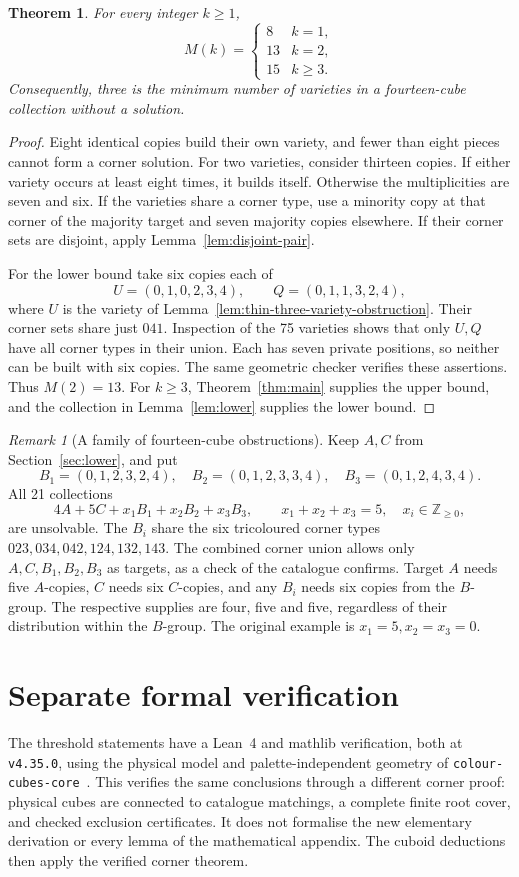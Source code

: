\documentclass[11pt]{article}
\newtheorem{theorem}{Theorem}
\theoremstyle{remark}
\newtheorem*{remark}{Remark}
\begin{document}
\begin{theorem}\label{thm:support}
For every integer $k\ge1$,
\[
 M(k)=\begin{cases}8&k=1,\\13&k=2,\\15&k\ge3.\end{cases}
\]
Consequently, three is the minimum number of varieties in a fourteen-cube
collection without a solution.
\end{theorem}
\begin{proof}
Eight identical copies build their own variety, and fewer than eight pieces
cannot form a corner solution. For two varieties, consider thirteen copies.
If either variety occurs at least eight times, it builds itself. Otherwise
the multiplicities are seven and six. If the varieties share a corner type,
use a minority copy at that corner of the majority target and seven majority
copies elsewhere. If their corner sets are disjoint, apply
Lemma~\ref{lem:disjoint-pair}.

For the lower bound take six copies each of
\[
 U=(0,1,0,2,3,4),\qquad Q=(0,1,1,3,2,4),
\]
where $U$ is the variety of Lemma~\ref{lem:thin-three-variety-obstruction}.
Their corner sets share just $041$. Inspection of the 75 varieties shows
that only $U,Q$ have all corner types in their union. Each has seven private
positions, so neither can be built with six copies. The same geometric
checker verifies these assertions. Thus $M(2)=13$. For $k\ge3$,
Theorem~\ref{thm:main} supplies the upper bound, and the collection in
Lemma~\ref{lem:lower} supplies the lower bound.
\end{proof}

\begin{remark}[A family of fourteen-cube obstructions]
Keep $A,C$ from Section~\ref{sec:lower}, and put
\[
 B_1=(0,1,2,3,2,4),\quad B_2=(0,1,2,3,3,4),\quad B_3=(0,1,2,4,3,4).
\]
All 21 collections
\[
 4A+5C+x_1B_1+x_2B_2+x_3B_3,\qquad
 x_1+x_2+x_3=5,\quad x_i\in\mathbb Z_{\ge0},
\]
are unsolvable. The $B_i$ share the six tricoloured corner types
$023,034,042,124,132,143$. The combined corner union allows only
$A,C,B_1,B_2,B_3$ as targets, as a check of the catalogue confirms.
Target $A$ needs five $A$-copies, $C$ needs six $C$-copies, and any $B_i$
needs six copies from the $B$-group. The respective supplies are four,
five and five, regardless of their distribution within the $B$-group.
The original example is $x_1=5,x_2=x_3=0$.
\end{remark}

\section{Separate formal verification}\label{sec:formal}
The threshold statements have a Lean~4 and mathlib verification, both at
\texttt{v4.35.0}, using the physical model and palette-independent geometry
of \texttt{colour-cubes-core}~\cite{ColourCubes}. This verifies the same
conclusions through a different corner proof: physical cubes are connected
to catalogue matchings, a complete finite root cover, and checked exclusion
certificates. It does not formalise the new elementary derivation or every
lemma of the mathematical appendix. The cuboid deductions then apply the
verified corner theorem.
\end{document}
